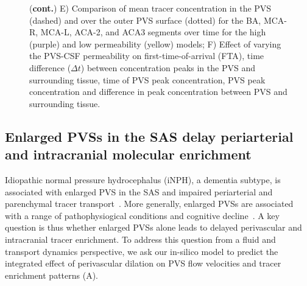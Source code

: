 \documentclass[fleqn,10pt]{wlscirep}
\begin{document}
\begin{figure}
\ContinuedFloat
\caption{(\textbf{cont.})
E) Comparison of mean tracer concentration in the PVS (dashed) and over the
outer PVS surface (dotted) for the BA, MCA-R, MCA-L, ACA-2, and ACA3 segments over time for the high (purple) and low permeability (yellow) models;
F) Effect of varying the PVS-CSF permeability on first-time-of-arrival (FTA), time difference ($\Delta t$) between concentration peaks in the PVS and surrounding tissue, time of PVS peak concentration, PVS peak concentration and difference in peak concentration between PVS and surrounding tissue.}
\end{figure}
  
\subsection*{Enlarged PVSs in the SAS delay periarterial and intracranial molecular enrichment}

Idiopathic normal pressure hydrocephalus (iNPH), a dementia subtype,
is associated with enlarged PVS in the SAS and impaired periarterial
and parenchymal tracer transport~\cite{eide2024functional}. More
generally, enlarged PVSs are associated with a range of pathophysiogical
conditions and cognitive decline~\cite{bown2022physiology}. A key
question is thus whether enlarged PVSs alone leads to delayed
perivascular and intracranial tracer enrichment. To address this
question from a fluid and transport dynamics perspective, we ask our
in-silico model to predict the integrated effect of perivascular
dilation on PVS flow velocities and tracer enrichment patterns
(A).
\end{document}
